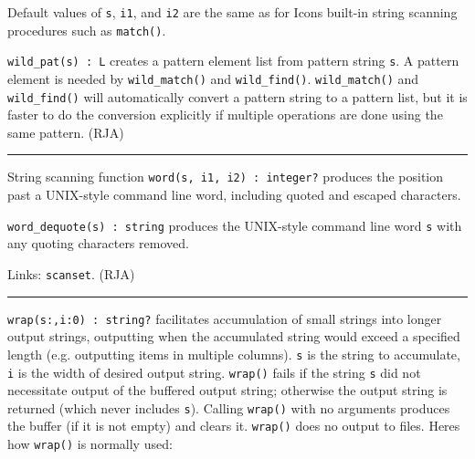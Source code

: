 Default values of \texttt{s}, \texttt{i1}, and \texttt{i2} are the same
as for Icon{\textquotesingle}s built-in string scanning procedures such
as \texttt{match()}.

\texttt{wild\_pat(s) : L} creates a pattern element list from pattern
string \texttt{s}. A pattern element is needed by
\texttt{wild\_match()} and \texttt{wild\_find()}.
\texttt{wild\_match()} and \texttt{wild\_find()} will automatically
convert a pattern string to a pattern list, but it is faster to do the
conversion explicitly if multiple operations are done using the same
pattern. (RJA)

\vspace{0.25cm}\hrule{}

String scanning function \texttt{word(s, i1, i2) : integer?} produces
the position past a UNIX-style command line word, including quoted and
escaped characters.

\texttt{word\_dequote(s) : string} produces the UNIX-style command line
word \texttt{s} with any quoting characters removed.

Links: \texttt{scanset}. (RJA)

\vspace{0.25cm}\hrule{}

\texttt{wrap}\texttt{(s:{\textquotedbl}{\textquotedbl},i:0)
: string?} facilitates accumulation of small strings into longer output
strings, outputting when the accumulated string would exceed a
specified length (e.g. outputting items in multiple columns).
\texttt{s} is the string to accumulate, \texttt{i} is the width of
desired output string. \texttt{wrap()} fails if the string \texttt{s}
did not necessitate output of the buffered output string; otherwise the
output string is returned (which never includes \texttt{s}). Calling
\texttt{wrap()} with no arguments produces the buffer (if it is not
empty) and clears it. \texttt{wrap()} does no output to files.
Here{\textquotesingle}s how \texttt{wrap()} is normally used:


